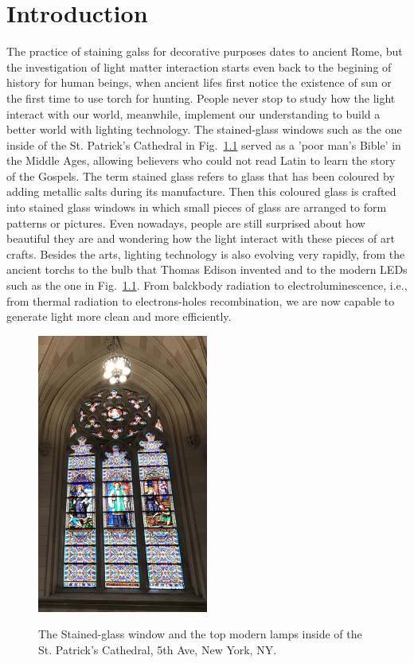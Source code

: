 \chapter{Introduction}

The practice of staining galss for decorative purposes dates to ancient Rome,
but the investigation of light matter interaction starts even back to the
begining of history for human beings, when ancient lifes first notice the
existence of sun or the first time to use torch for hunting. People never stop
to study how the light interact with our world, meanwhile, implement our
understanding to build a better world with lighting technology. The
stained-glass windows such as the one inside of the St. Patrick's Cathedral in
Fig.~\ref{StainGlass} served as a 'poor man's Bible' in the Middle Ages,
allowing believers who could not read Latin to learn the story of the Gospels.
The term stained glass refers to glass that has been coloured by adding
metallic salts during its manufacture. Then this coloured glass is crafted into
stained glass windows in which small pieces of glass are arranged to form
patterns or pictures. Even nowadays, people are still surprised about how
beautiful they are and wondering how the light interact with these pieces of
art crafts. Besides the arts, lighting technology is also evolving very
rapidly, from the ancient torchs to the bulb that Thomas Edison invented and to
the modern LEDs such as the one in Fig.~\ref{StainGlass}. From balckbody
radiation to electroluminescence, i.e., from thermal radiation to
electrons-holes recombination, we are now capable to generate light more clean
and more efficiently.

\begin{figure}
  \caption{The Stained-glass window and the top modern lamps inside of the St. Patrick's Cathedral, 5th Ave, New York, NY.}
  \centering
  \includegraphics[width=0.5\textwidth,height=0.5\textheight]{pictures/Introduction/StainGlass}
  \label{StainGlass}
\end{figure}

